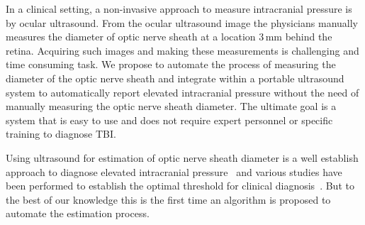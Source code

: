 \documentclass{llncs}
\begin{document}
In a clinical setting, a non-invasive approach to measure intracranial pressure is
by ocular ultrasound. From the ocular ultrasound image the physicians manually
measures the diameter of optic nerve sheath at a location 3\,mm behind the retina.
Acquiring such images and making these measurements is challenging and time
consuming task. We propose to automate the process of measuring the diameter of
the optic nerve sheath and integrate within a portable ultrasound system to
automatically report elevated intracranial pressure without the need of manually
measuring the optic nerve sheath diameter. The ultimate goal is a system that is
easy to use and does not require expert personnel or specific training to
diagnose TBI.    

Using ultrasound for estimation of optic nerve sheath diameter is a well
establish approach to diagnose elevated intracranial
pressure~\cite{Ki2008,Ro2011} and various studies have been performed to
establish the optimal threshold for clinical
diagnosis~\cite{Ga2005,Mo2009,Du2011,Ra2011}. But to the best of our knowledge
this is the first time an algorithm is proposed to automate the estimation
process.
\end{document}
